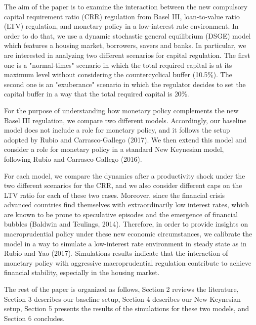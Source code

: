\documentclass[final,3p,times,twocolumn]{elsarticle}
\begin{document}
The aim of the paper is to examine the interaction between the new compulsory capital requirement ratio (CRR) regulation from Basel III, loan-to-value ratio (LTV) regulation, and monetary policy in a low-interest rate environment. In order to do that, we use a dynamic stochastic general equilibrium (DSGE) model which features a housing market, borrowers, savers and banks. In particular, we are interested in analyzing two different scenarios for capital regulation. The first one is a "normal-times" scenario in which the total required capital is at its maximum level without considering the countercyclical buffer (10.5\%). The second one is an "exuberance" scenario in which the regulator decides to set the capital buffer in a way that the total required capital is 20\%.\par

For the purpose of understanding how monetary policy complements the new Basel III regulation, we compare two different models. Accordingly, our baseline model does not include a role for monetary policy, and it follows the setup adopted by Rubio and Carrasco-Gallego (2017). We then extend this model and consider a role for monetary policy in a standard New Keynesian model, following Rubio and Carrasco-Gallego (2016).\par 

For each model, we compare the dynamics after a productivity shock under the two different scenarios for the CRR, and we also consider different caps on the LTV ratio for each of these two cases. Moreover, since the financial crisis advanced countries find themselves with extraordinarily low interest rates, which are known to be prone to speculative episodes and the emergence of financial bubbles (Baldwin and Teulings, 2014). Therefore, in order to provide insights on macroprudential policy under these new economic circumstances, we calibrate the model in a way to simulate a low-interest rate environment in steady state as in Rubio and Yao (2017). Simulations results indicate that the interaction of monetary policy with aggressive macroprudential regulation contribute to achieve financial stability, especially in the housing market.\par


The rest of the paper is organized as follows, Section 2 reviews the literature, Section 3 describes our baseline setup, Section 4 describes our New Keynesian setup, Section 5 presents the results of the simulations for these two models, and Section 6 concludes.\par
\end{document}
